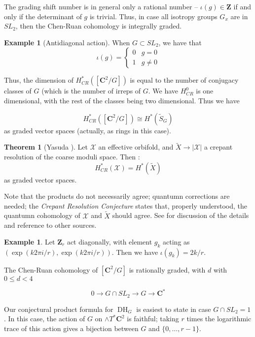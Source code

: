 \documentclass{amsart}[12pt]
\theoremstyle{definition}
\newtheorem{theorem}[dummy]{Theorem}
\newtheorem{example}[dummy]{Example}
\newcommand{\Z}{\mathbf{Z}}
\newcommand{\C}{\mathbf{C}}
\DeclareMathOperator{\DC}{DH}
\begin{document}
The grading shift number is in general only a rational number -- $\iota(g)\in \Z$ if and only if the determinant of $g$ is trivial.  Thus, in case all isotropy groups $G_x$ are in $SL_2$, then the Chen-Ruan cohomology is integrally graded.

\begin{example}[Antidiagonal action]
When $G\subset SL_2$, we have that 
$$\iota(g)=\left\{\begin{array}{rl} 0 & g=0 \\
1 & g\neq 0 \end{array}\right.
$$

Thus, the dimension of $H_{CR}^*([\C^2/G])$ is equal to the number of conjugacy classes of $G$ (which is the number of irreps of $G$.  We have $H_{CR}^0$ is one dimensional, with the rest of the classes being two dimensional.  Thus we have

$$H_{CR}^*([\C^2/G])\cong H^*(\widetilde{S}_G)$$
as graded vector spaces (actually, as rings in this case).  
\end{example}


\begin{theorem}[Yasuda \cite{yasuda}] \label{thm:yasuda}
Let $\mathcal{X}$ an effective orbifold, and $\widetilde{X}\to|\mathcal{X}|$ a crepant resolution of the coarse moduli space.  Then :
$$H_{CR}^*(\mathcal{X})=H^*(\widetilde{X})$$
as graded vector spaces.  
\end{theorem}

Note that the products do not necessarily agree; quantumn corrections are needed; the \emph{Crepant Resolution Conjecture} states that, properly understood, the quantumn cohomology of $\mathcal{X}$ and $\widetilde{X}$ should agree.  See \cite{CoatesRuan} for discussion of the details and reference to other sources.


\begin{example}
Let $\Z_r$ act diagonally, with element $g_k$ acting as $(\exp(k2\pi i/r),\exp(k2\pi i/r))$.  Then we have $\iota(g_k)=2k/r$.
\end{example}




The Chen-Ruan cohomology of $[\C^2/G]$ is rationally graded, with $d$ with $0\leq d < 4$


$$0\to G\cap SL_2\to G \to \C^*$$








Our conjectural product formula for $\DC_G$ is easiest to state in case $G\cap SL_2=1$.  In this case, the action of $G$ on $\wedge T^*\C^2$ is faithful; taking $r$ times the logarithmic trace of this action gives a bijection between $G$ and $\{0,\dots, r-1\}$.
\end{document}
